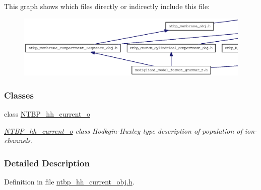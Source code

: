 This graph shows which files directly or indirectly include this file:
\nopagebreak
\begin{figure}[H]
\begin{center}
\leavevmode
\includegraphics[width=400pt]{ntbp__hh__current__obj_8h__dep__incl}
\end{center}
\end{figure}
\subsubsection*{Classes}
\begin{DoxyCompactItemize}
\item 
class \hyperlink{class_n_t_b_p__hh__current__o}{NTBP\_\-hh\_\-current\_\-o}
\begin{DoxyCompactList}\small\item\em \hyperlink{class_n_t_b_p__hh__current__o}{NTBP\_\-hh\_\-current\_\-o} class Hodkgin-\/Huxley type description of population of ion-\/channels. \item\end{DoxyCompactList}\end{DoxyCompactItemize}


\subsubsection{Detailed Description}


Definition in file \hyperlink{ntbp__hh__current__obj_8h_source}{ntbp\_\-hh\_\-current\_\-obj.h}.

